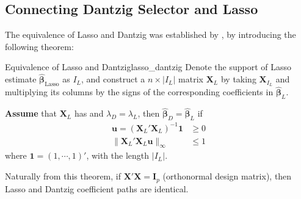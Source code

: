 \documentclass[twoside]{article}
\begin{document}
\subsection{Connecting Dantzig Selector and Lasso}
The equivalence of Lasso and Dantzig was established by \citet{james2009dasso}, by introducing the following theorem:
\begin{theorem}{Equivalence of Lasso and Dantzig}{lasso_dantzig}
    Denote the support of Lasso estimate $\hat{\boldsymbol{\beta}}_{\text{Lasso}}$ as $I_L$, and construct a $n \times \lvert I_L\rvert$ matrix $\mathbf{X}_L$ by taking $\mathbf{X}_{I_L}$ and multiplying its columns by the signs of the corresponding coefficients in $\hat{\boldsymbol{\beta}}_L$.
    
    \textbf{Assume} that $\mathbf{X}_L$ has  and $\lambda_D =\lambda_L$, then $\hat{\boldsymbol{\beta}}_D=\hat{\boldsymbol{\beta}}_L $ if 
    \begin{align*}
        \mathbf{u} = \left(\mathbf{X}_L'\mathbf{X}_L\right)^{-1}\mathbf{1} &\geq 0 \\
        \lVert \mathbf{X}_L'\mathbf{X}_L\mathbf{u} \rVert _{\infty} &\leq 1
    \end{align*}
    where $\mathbf{1} = (1,\cdots,1)'$, with the length $\lvert I_L \rvert$.
\end{theorem}
Naturally from this theorem, if $\mathbf{X}'\mathbf{X}=\mathbf{I}_p$ (orthonormal design matrix), then Lasso and Dantzig coefficient paths are identical.
\end{document}

